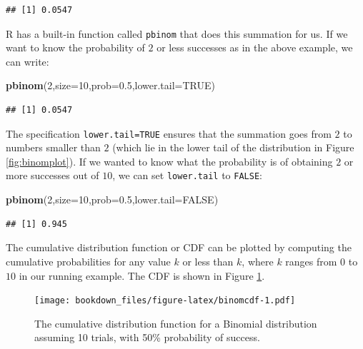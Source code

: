 \documentclass[12pt,]{krantz}
\newenvironment{Shaded}{\begin{snugshade}}{\end{snugshade}}
\newcommand{\DataTypeTok}[1]{\textcolor[rgb]{0.13,0.29,0.53}{#1}}
\newcommand{\DecValTok}[1]{\textcolor[rgb]{0.00,0.00,0.81}{#1}}
\newcommand{\FloatTok}[1]{\textcolor[rgb]{0.00,0.00,0.81}{#1}}
\newcommand{\KeywordTok}[1]{\textcolor[rgb]{0.13,0.29,0.53}{\textbf{#1}}}
\newcommand{\NormalTok}[1]{#1}
\newcommand{\OtherTok}[1]{\textcolor[rgb]{0.56,0.35,0.01}{#1}}
\theoremstyle{definition}
\theoremstyle{definition}
\theoremstyle{definition}
\theoremstyle{remark}
\begin{document}
\begin{verbatim}
## [1] 0.0547
\end{verbatim}

R has a built-in function called \texttt{pbinom} that does this summation for us. If we want to know the probability of \(2\) or less successes as in the above example, we can write:

\begin{Shaded}
\begin{Highlighting}[]
\KeywordTok{pbinom}\NormalTok{(}\DecValTok{2}\NormalTok{,}\DataTypeTok{size=}\DecValTok{10}\NormalTok{,}\DataTypeTok{prob=}\FloatTok{0.5}\NormalTok{,}\DataTypeTok{lower.tail=}\OtherTok{TRUE}\NormalTok{)}
\end{Highlighting}
\end{Shaded}

\begin{verbatim}
## [1] 0.0547
\end{verbatim}

The specification \texttt{lower.tail=TRUE} ensures that the summation goes from \(2\) to numbers smaller than \(2\) (which lie in the lower tail of the distribution in Figure \ref{fig:binomplot}). If we wanted to know what the probability is of obtaining \(2\) or more successes out of \(10\), we can set \texttt{lower.tail} to \texttt{FALSE}:

\begin{Shaded}
\begin{Highlighting}[]
\KeywordTok{pbinom}\NormalTok{(}\DecValTok{2}\NormalTok{,}\DataTypeTok{size=}\DecValTok{10}\NormalTok{,}\DataTypeTok{prob=}\FloatTok{0.5}\NormalTok{,}\DataTypeTok{lower.tail=}\OtherTok{FALSE}\NormalTok{)}
\end{Highlighting}
\end{Shaded}

\begin{verbatim}
## [1] 0.945
\end{verbatim}

The cumulative distribution function or CDF can be plotted by computing the cumulative probabilities for any value \(k\) or less than \(k\), where \(k\) ranges from \(0\) to \(10\) in our running example. The CDF is shown in Figure \ref{fig:binomcdf}.

\begin{figure}
\centering
\texttt{[image: bookdown\_files/figure-latex/binomcdf-1.pdf]}
\caption{\label{fig:binomcdf}The cumulative distribution function for a Binomial distribution assuming 10 trials, with 50\% probability of success.}
\end{figure}
\end{document}
